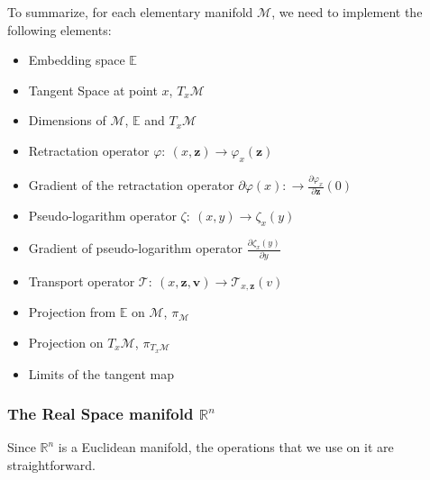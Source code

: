 To summarize, for each elementary manifold $\mathcal{M}$, we need to implement the following elements:
\begin{itemize}
  \item Embedding space $\mathbb{E}$
  \item Tangent Space at point $x$, $T_x\mathcal{M}$
  \item Dimensions of $\mathcal{M}$, $\mathbb{E}$ and $T_x\mathcal{M}$
  \item Retractation operator $\varphi:\ (x,\mathbf{z}) \rightarrow \varphi_x(\mathbf{z})$
  \item Gradient of the retractation operator $\partial \varphi(x):\rightarrow \frac{\partial \varphi_x}{\partial \mathbf{z}}(0)$
  \item Pseudo-logarithm operator $\zeta:\ (x,y) \rightarrow \zeta_x(y)$
  \item Gradient of pseudo-logarithm operator $\frac{\partial \zeta_x(y)}{\partial y}$
  \item Transport operator $\mathcal{T}:\ (x,\mathbf{z}, \mathbf{v})\rightarrow \mathcal{T}_{x,\mathbf{z}}(v)$
  \item Projection from $\mathbb{E}$ on $\mathcal{M}$, $\pi_\mathcal{M}$
  \item Projection on $T_x\mathcal{M}$, $\pi_{T_x\mathcal{M}}$
  \item Limits of the tangent map
\end{itemize}

\subsubsection{The Real Space manifold $\mathbb{R}^n$}
\label{ssub:the_real_space}
Since $\mathbb{R}^n$ is a Euclidean manifold, the operations that we use on it are straightforward.

